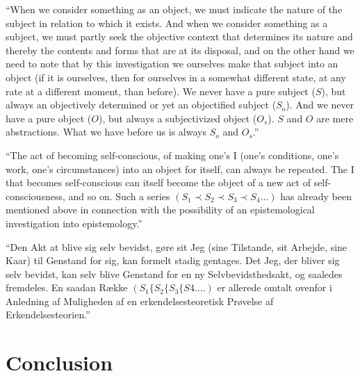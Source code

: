 \documentclass[fleqn]{beamer}
\begin{document}
\begin{frame}{\mbox{}}

  ``When we consider something as an object, we must indicate the
  nature of the subject in relation to which it exists. And when we
  consider something as a subject, we must partly seek the objective
  context that determines its nature and thereby the contents and
  forms that are at its disposal, and on the other hand we need to
  note that by this investigation we ourselves make that subject into
  an object (if it is ourselves, then for ourselves in a somewhat
  different state, at any rate at a different moment, than before). We
  never have a pure subject ($S$), but always an objectively
  determined or yet an objectified subject ($S_o$). And we never have
  a pure object ($O$), but always a subjectivized object ($O_s$). $S$
  and $O$ are mere abstractions. What we have before us is always
  $S_o$ and $O_s$.'' \citep[298]{hoffding1910}


\end{frame}

\begin{frame}{\mbox{}}

  ``The act of becoming self-conscious, of making one's I (one's
  conditions, one's work, one's circumstances) into an object for
  itself, can always be repeated. The I that becomes self-conscious
  can itself become the object of a new act of self-consciousness, and
  so on. Such a series $(S_1 \prec S_2 \prec S_3 \prec S_4 \dots )$
  has already been mentioned above in connection with the possibility
  of an epistemological investigation into epistemology.''
  \citep[36]{hoffding1917}

\end{frame}

\begin{frame}{\mbox{}}

  ``Den Akt at blive sig selv bevidst, gøre sit Jeg (sine Tilstande,
  sit Arbejde, sine Kaar) til Genstand for sig, kan formelt stadig
  gentages. Det Jeg, der bliver sig selv bevidst, kan selv blive
  Genstand for en ny Selvbevidsthedsakt, og saaledes fremdeles. En
  saadan Række $(S_1 \{ S_2 \{ S_3 \{ S4 ....)$ er allerede omtalt
  ovenfor i Anledning af Muligheden af en erkendelsesteoretisk
  Prøvelse af Erkendelsesteorien.'' \citep[36]{hoffding1917}

\end{frame}

\section{Conclusion}
\end{document}
